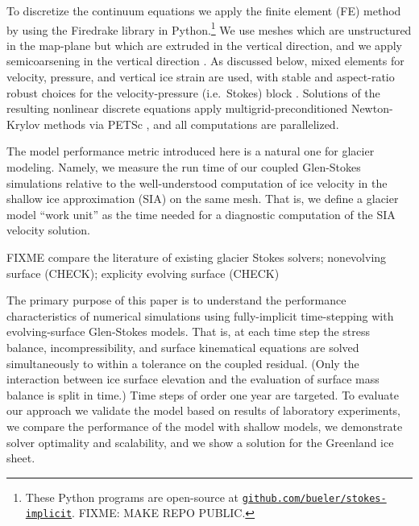 \documentclass[letterpaper,final,12pt,reqno]{amsart}
\begin{document}
To discretize the continuum equations we apply the finite element (FE) method \cite{Elmanetal2014} by using the Firedrake library \cite{Rathgeberetal2016} in Python.\footnote{These Python programs are open-source at \href{https://github.com/bueler/stokes-implicit}{\texttt{github.com/bueler/stokes-implicit}}.  FIXME: MAKE REPO PUBLIC.}  We use meshes which are unstructured in the map-plane but which are extruded \cite{Gibsonetal2019} in the vertical direction, and we apply semicoarsening in the vertical direction \cite{Tuminaroetal2016}.  As discussed below, mixed elements for velocity, pressure, and vertical ice strain are used, with stable and aspect-ratio robust choices for the velocity-pressure (i.e.~Stokes) block \cite{Elmanetal2014}.  Solutions of the resulting nonlinear discrete equations apply multigrid-preconditioned Newton-Krylov methods \cite{Bueler2021} via PETSc \cite{Balayetal2020}, and all computations are parallelized.

The model performance metric introduced here is a natural one for glacier modeling.  Namely, we measure the run time of our coupled Glen-Stokes simulations relative to the well-understood computation of ice velocity in the shallow ice approximation (SIA) \cite{Fowler1997} on the same mesh.  That is, we define a glacier model ``work unit'' as the time needed for a diagnostic computation of the SIA velocity solution.

FIXME compare the literature of existing glacier Stokes solvers; nonevolving surface \cite{IsaacStadlerGhattas2015,Tuminaroetal2016,Zwingeretal2007} (CHECK); explicity evolving surface \cite{Gudmundsson1999,Jouvetetal2008,Larouretal2012,LeysingerGudmundsson2004,PralongFunk2004,Seddiketal2012} (CHECK)

The primary purpose of this paper is to understand the performance characteristics of numerical simulations using fully-implicit time-stepping with evolving-surface Glen-Stokes models.  That is, at each time step the stress balance, incompressibility, and surface kinematical equations are solved simultaneously to within a tolerance on the coupled residual.  (Only the interaction between ice surface elevation and the evaluation of surface mass balance is split in time.)  Time steps of order one year are targeted.  To evaluate our approach we validate the model based on results of laboratory experiments, we compare the performance of the model with shallow models, we demonstrate solver optimality and scalability, and we show a solution for the Greenland ice sheet.
\end{document}
